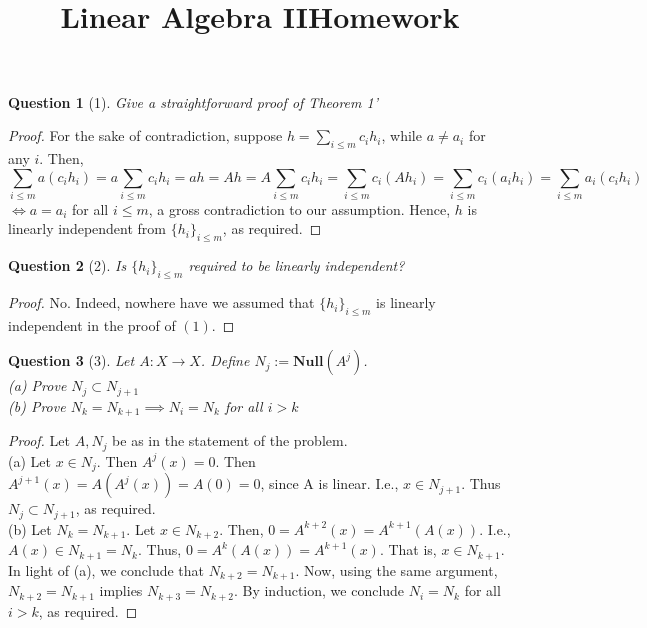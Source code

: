 \documentclass[11pt]{article}
\title{\vspace{-50pt}
\Huge \name
\\\vspace{20pt}
\huge Linear Algebra II\hfill Homework \hw}
\author{}
\date{}
\theoremstyle{quest}
\newtheorem*{question}{Question}
\begin{document}
\maketitle

\begin{question}[1]
Give a straightforward proof of Theorem 1'
\end{question}
\begin{proof}
  For the sake of contradiction, suppose $h = \sum_{i \le m} c_i h_i$, while $a \ne a_i$ for any $i$. Then,
  $$\sum_{i \le m} a (c_i h_i) = a \sum_{i \le m} c_i h_i = ah = Ah = A \sum_{i \le m} c_i h_i = \sum_{i \le m} c_i (A h_i) = \sum_{i \le m} c_i (a_i h_i) = \sum_{i \le m} a_i (c_i h_i)$$ $\iff a = a_i$ for all $i \le m$, a gross contradiction to our assumption. Hence, $h$ is linearly independent from $\{h_i\}_{i \le m}$, as required.
\end{proof}

\begin{question}[2]
Is $\{h_i\}_{i \le m}$ required to be linearly independent?
\end{question}
\begin{proof}
  No. Indeed, nowhere have we assumed that $\{h_i\}_{i \le m}$ is linearly independent in the proof of $(1)$.
\end{proof}

\begin{question}[3]
Let $A: X \rightarrow X$. Define $N_j := \mathbf{Null}(A^j)$.
\\(a) Prove $N_j \subset N_{j+1}$
\\(b) Prove $N_k = N_{k+1} \implies N_i = N_k$ for all $i > k$
\end{question}
\begin{proof}
  Let $A, N_j$ be as in the statement of the problem.
  \\(a) Let $x \in N_j$. Then $A^j(x) = 0$. Then $A^{j+1}(x) = A(A^j(x)) = A(0) = 0$, since A is linear. I.e., $x \in N_{j+1}$. Thus $N_j \subset N_{j+1}$, as required.
  \\(b) Let $N_k = N_{k+1}$. Let $x \in N_{k+2}$. Then, $0 = A^{k+2}(x) = A^{k+1}(A(x))$. I.e., $A(x) \in N_{k+1} = N_k$. Thus, $0 = A^k(A(x)) = A^{k+1}(x)$. That is, $x \in N_{k+1}$. In light of (a), we conclude that $N_{k+2} = N_{k+1}$. Now, using the same argument, $N_{k+2} = N_{k+1}$ implies $N_{k+3} = N_{k+2}$. By induction, we conclude $N_i = N_k$ for all $i > k$, as required.
\end{proof}
\end{document}
